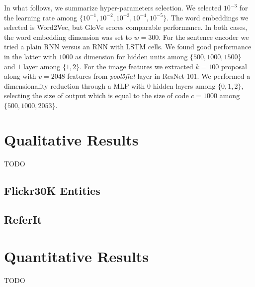 In what follows, we summarize hyper-parameters selection. We selected
$10^{-3}$ for the learning rate among $\{ 10^{-1}, 10^{-2}, 10^{-3},
10^{-4}, 10^{-5} \}$. The word embeddings we selected is Word2Vec, but
GloVe scores comparable performance. In both cases, the word embedding
dimension was set to $w = 300$. For the sentence encoder we tried a
plain RNN versus an RNN with LSTM cells. We found good performance in
the latter with $1000$ as dimension for hidden units among $\{ 500,
1000, 1500 \}$  and $1$ layer among $\{ 1, 2 \}$. For the image
features we extracted $k = 100$ proposal along with $v = 2048$
features from \textit{pool5\textunderscore flat} layer in ResNet-101.
We performed a dimensionality reduction through a MLP with $0$ hidden
layers among $\{ 0, 1, 2 \}$, selecting the size of output which is
equal to the size of code $c = 1000$ among $\{ 500, 1000, 2053 \}$.

\section{Qualitative Results}

TODO

\subsection{Flickr30K Entities}

\subsection{ReferIt}


\section{Quantitative Results}
\label{sec:quantitative-results}

TODO
